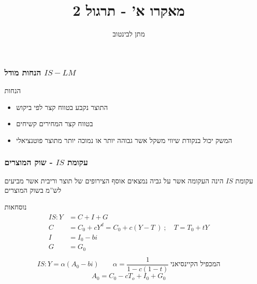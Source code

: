 \documentclass[usenames,dvipsnames]{beamer}
\title[{}]{{מאקרו א' - תרגול 2}}
\author{\texthebrew{ מתן לבינטוב}}
\institute[{ אב"ג}]{{ אוניברסיטת בן גוריון בנגב}}
\begin{document}
	\begin{RTL}
		\begin{frame}
			\titlepage
		\end{frame}

        \begin{frame}
            \frametitle{ הנחות מודל  $ IS-LM $  }
            \begin{block}{הנחות}
                \begin{itemize}
                    \item התוצר נקבע בטווח קצר לפי ביקוש
                    \item בטווח קצר המחירים קשיחים
                    \item המשק יכול בנקודת שיווי משקל אשר גבוהה יותר או נמוכה יותר מתוצר פוטנציאלי
                \end{itemize}
            \end{block}
        \end{frame}


        \begin{frame}
            \frametitle{עקומת $IS$ - שוק המוצרים}
            עקומת $IS$ הינה העקומה אשר על גביה נמצאים אוסף הצירופים של תוצר וריבית אשר מביעים לש''מ בשוק המוצרים
            \begin{block}{נוסחאות}
                \begin{align*}
                    \begin{split}
                        IS : Y &= C + I + G \\
                        C & = C_0 + cY^d = C_0  + c\left( Y-T \ \right) \   ; \quad T = T_0 + tY \\
                        I & =   I_0 - bi \\ 
                        G &= G_0 \\ 
                    \end{split}
                \end{align*}
                \begin{equation*}
                    IS : Y = \alpha \left( A_0 - bi \right) \qquad \alpha = \frac{1}{1-c(1-t)} \: \text{המכפיל הקיינסיאני}
                \end{equation*}
                \begin{equation*}
                    A_0 = C_0 - cT_o + I_0 + G_0
                \end{equation*}
            \end{block}



\end{frame}
\end{RTL}
\end{document}
